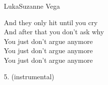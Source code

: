 \begin{song}{Luka}{Suzanne Vega}

\begin{guitar}
And they only hit until you cry\\
And after that you don't ask why\\
You just don't argue anymore\\
You just don't argue anymore\\
You just don't argue anymore\\
\end{guitar}

\begin{guitar}
5. (instrumental)\\
\end{guitar}
\end{song}
